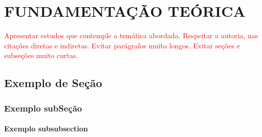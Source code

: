 \chapter{FUNDAMENTAÇÃO TEÓRICA}

\textcolor{red}{Apresentar estudos que contemple a temática abordada. Respeitar a autoria,
nas citações diretas e indiretas. Evitar parágrafos muito longos. Evitar seções e
subseções muito curtas.}

\section{Exemplo de Seção}

\subsection{Exemplo subSeção}

\subsubsection{Exemplo subsubsection}

